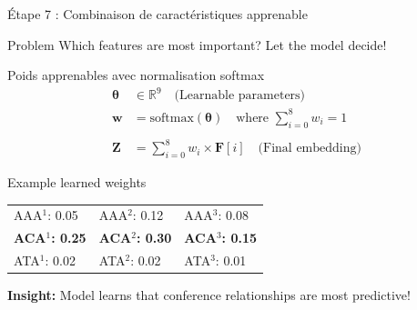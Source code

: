 \documentclass[9pt,aspectratio=169,professionalfonts]{beamer}
\begin{document}
\begin{frame}{Étape 7 : Combinaison de caractéristiques apprenable}
\begin{alertblock}{Problem}
Which features are most important? Let the model decide!
\end{alertblock}

\begin{block}{Poids apprenables avec normalisation softmax}
\begin{align}
\boldsymbol{\theta} &\in \mathbb{R}^9 \quad \text{(Learnable parameters)} \\
\mathbf{w} &= \text{softmax}(\boldsymbol{\theta}) \quad \text{where } \sum_{i=0}^{8} w_i = 1 \\
\\
\mathbf{Z} &= \sum_{i=0}^{8} w_i \times \mathbf{F}[i] \quad \text{(Final embedding)}
\end{align}
\end{block}

\begin{exampleblock}{Example learned weights}
\begin{center}
\begin{tabular}{lll}
\toprule
AAA$^1$: 0.05 & AAA$^2$: 0.12 & AAA$^3$: 0.08 \\
\textbf{ACA$^1$: 0.25} & \textbf{ACA$^2$: 0.30} & \textbf{ACA$^3$: 0.15} \\
ATA$^1$: 0.02 & ATA$^2$: 0.02 & ATA$^3$: 0.01 \\
\bottomrule
\end{tabular}
\end{center}
\textbf{Insight:} Model learns that conference relationships are most predictive!
\end{exampleblock}
\end{frame}
\end{document}
